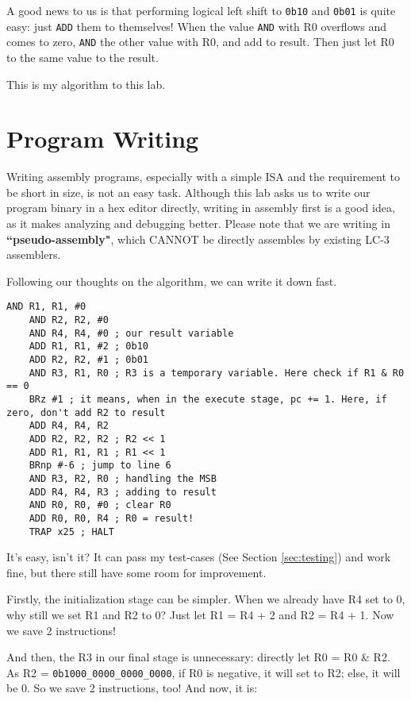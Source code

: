 \documentclass{article}
\begin{document}
	A good news to us is that performing logical left shift to \texttt{0b10} and \texttt{0b01} is quite easy: just \texttt{ADD} them to themselves! When the value \texttt{AND} with R0 overflows and comes to zero, \texttt{AND} the other value with R0, and add to result. Then just let R0 to the same value to the result.
	
	This is my algorithm to this lab.
	
	\section{Program Writing}
	
	Writing assembly programs, especially with a simple ISA and the requirement to be short in size, is not an easy task. Although this lab asks us to write our program binary in a hex editor directly, writing in assembly first is a good idea, as it makes analyzing and debugging better. Please note that we are writing in \textbf{``pseudo-assembly"}, which CANNOT be directly assembles by existing LC-3 assemblers. 
	
	Following our thoughts on the algorithm, we can write it down fast.
	
	\begin{lstlisting}[caption={My first, ``unstripped" program},captionpos=b]
	AND R1, R1, #0
	AND R2, R2, #0
	AND R4, R4, #0 ; our result variable
	ADD R1, R1, #2 ; 0b10
	ADD R2, R2, #1 ; 0b01
	AND R3, R1, R0 ; R3 is a temporary variable. Here check if R1 & R0 == 0
	BRz #1 ; it means, when in the execute stage, pc += 1. Here, if zero, don't add R2 to result
	ADD R4, R4, R2
	ADD R2, R2, R2 ; R2 << 1
	ADD R1, R1, R1 ; R1 << 1
	BRnp #-6 ; jump to line 6
	AND R3, R2, R0 ; handling the MSB
	ADD R4, R4, R3 ; adding to result
	AND R0, R0, #0 ; clear R0
	ADD R0, R0, R4 ; R0 = result!
	TRAP x25 ; HALT
	\end{lstlisting}
	
	It's easy, isn't it? It can pass my test-cases (See Section \ref{sec:testing}) and work fine, but there still have some room for improvement.
	
	Firstly, the initialization stage can be simpler. When we already have R4 set to 0, why still we set R1 and R2 to 0? Just let R1 = R4 + 2 and R2 = R4 + 1. Now we save 2 instructions!
	
	And then, the R3 in our final stage is unnecessary: directly let R0 = R0 \& R2. As R2 = \texttt{0b1000\_0000\_0000\_0000}, if R0 is negative, it will set to R2; else, it will be 0. So we save 2 instructions, too! And now, it is:
	
\end{document}
